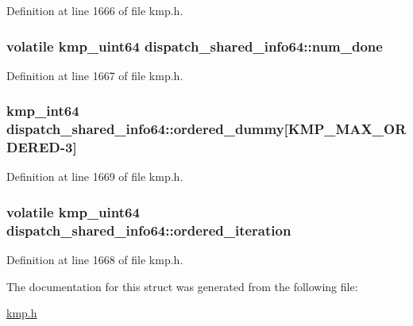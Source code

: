 Definition at line 1666 of file kmp.\-h.

\hypertarget{structdispatch__shared__info64_a77495e337de2169cbb6f69849bcab4ca}{
\subsubsection[{num\-\_\-done}]{\setlength{\rightskip}{0pt plus 5cm}volatile kmp\-\_\-uint64 dispatch\-\_\-shared\-\_\-info64\-::num\-\_\-done}}\label{structdispatch__shared__info64_a77495e337de2169cbb6f69849bcab4ca}


Definition at line 1667 of file kmp.\-h.

\hypertarget{structdispatch__shared__info64_aec78587b0a9d5e09f8347079e7101a16}{
\subsubsection[{ordered\-\_\-dummy}]{\setlength{\rightskip}{0pt plus 5cm}kmp\-\_\-int64 dispatch\-\_\-shared\-\_\-info64\-::ordered\-\_\-dummy\mbox{[}{\bf K\-M\-P\-\_\-\-M\-A\-X\-\_\-\-O\-R\-D\-E\-R\-E\-D}-\/3\mbox{]}}}\label{structdispatch__shared__info64_aec78587b0a9d5e09f8347079e7101a16}


Definition at line 1669 of file kmp.\-h.

\hypertarget{structdispatch__shared__info64_aeeadb332311f2be435d7e88e1c0ee23a}{
\subsubsection[{ordered\-\_\-iteration}]{\setlength{\rightskip}{0pt plus 5cm}volatile kmp\-\_\-uint64 dispatch\-\_\-shared\-\_\-info64\-::ordered\-\_\-iteration}}\label{structdispatch__shared__info64_aeeadb332311f2be435d7e88e1c0ee23a}


Definition at line 1668 of file kmp.\-h.



The documentation for this struct was generated from the following file\-:\begin{DoxyCompactItemize}
\item 
\hyperlink{kmp_8h}{kmp.\-h}\end{DoxyCompactItemize}
